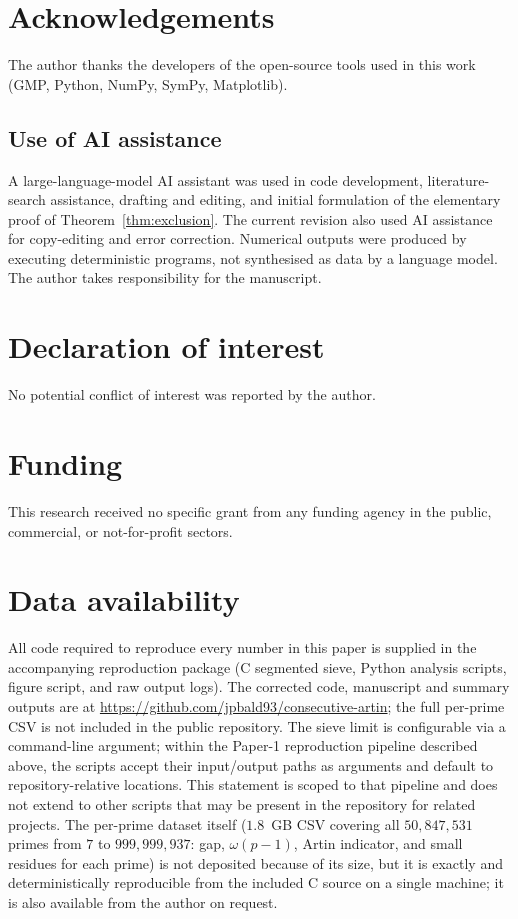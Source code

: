 \documentclass[11pt]{amsart}
\theoremstyle{definition}
\begin{document}
\section*{Acknowledgements}
The author thanks the developers of the open-source tools used in this work
(GMP, Python, NumPy, SymPy, Matplotlib).

\subsection*{Use of AI assistance}
A large-language-model AI assistant was used in code development,
literature-search assistance, drafting and editing, and initial formulation
of the elementary proof of Theorem~\ref{thm:exclusion}. The current revision
also used AI assistance for copy-editing and error correction. Numerical
outputs were produced by executing deterministic programs, not synthesised as
data by a language model. The author takes responsibility for the manuscript.

\section*{Declaration of interest}
No potential conflict of interest was reported by the author.

\section*{Funding}
This research received no specific grant from any funding agency in the
public, commercial, or not-for-profit sectors.

\section*{Data availability}
All code required to reproduce every number in this paper is supplied in the
accompanying reproduction package (C segmented sieve, Python analysis scripts,
figure script, and raw output logs). The corrected code, manuscript and summary
outputs are at \url{https://github.com/jpbald93/consecutive-artin}; the
full per-prime CSV is not included in the public repository. The sieve limit is
configurable via a command-line argument; within the Paper-1 reproduction
pipeline described above, the scripts accept their input/output paths as
arguments and default to repository-relative locations. This statement is
scoped to that pipeline and does not extend to other scripts that may be
present in the repository for related projects.
The per-prime dataset itself ($1.8$~GB CSV covering all $50{,}847{,}531$
primes from $7$ to $999{,}999{,}937$: gap, $\omega(p-1)$, Artin indicator,
and small residues for each prime) is not deposited because of its size, but
it is exactly and deterministically reproducible from the included C source on
a single machine; it is also available from the author on request.
\end{document}
